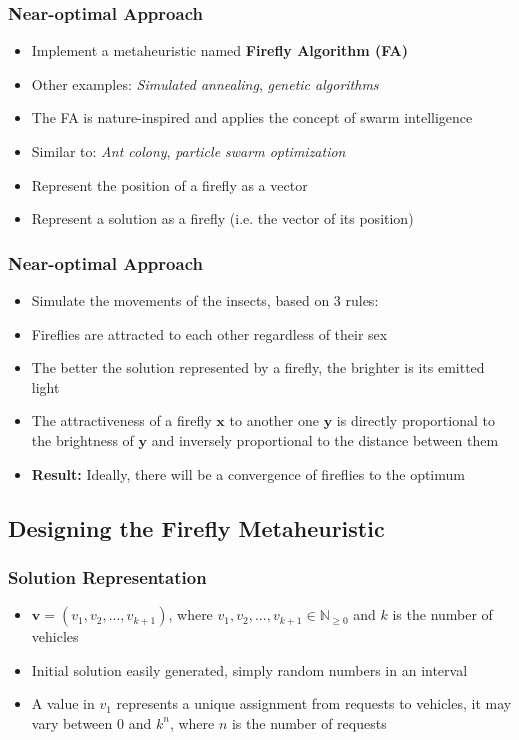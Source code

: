 \documentclass{beamer}
\begin{document}
\begin{frame}
\frametitle{Near-optimal Approach}
\begin{itemize}
\item Implement a metaheuristic named \textbf{Firefly Algorithm (FA)}
\item Other examples: \emph{Simulated annealing}, \emph{genetic algorithms}
\item The FA is nature-inspired and applies the concept of swarm intelligence
\item Similar to: \emph{Ant colony}, \emph{particle swarm optimization}
\pause
\item Represent the position of a firefly as a vector
\item Represent a solution as a firefly (i.e. the vector of its position)
\end{itemize}
\end{frame}

\begin{frame}
\frametitle{Near-optimal Approach}
\begin{itemize}
\item Simulate the movements of the insects, based on 3 rules:
\pause
\item Fireflies are attracted to each other regardless of their sex
\pause
\item The better the solution represented by a firefly, the brighter is its emitted light
\pause
\item The attractiveness of a firefly $\mathbf{x}$ to another one $\mathbf{y}$ is directly proportional to the brightness of $\mathbf{y}$ and inversely proportional to the distance between them
\pause
\item \textbf{Result:} Ideally, there will be a convergence of fireflies to the optimum
\end{itemize}
\end{frame}

\subsection{Designing the Firefly Metaheuristic}

\begin{frame}
\frametitle{Solution Representation}
\begin{itemize}
\item $\mathbf{v} = (v_1, v_2,...,v_{k+1})$, where $v_1,v_2,...,v_{k+1} \in \mathbb{N}_{\geq0}$ and $k$ is the number of vehicles
\item Initial solution easily generated, simply random numbers in an interval
\pause
\item A value in $v_1$ represents a unique assignment from requests to vehicles, it may vary between $0$ and $k^n$, where $n$ is the number of requests
\end{itemize}
\end{frame}
\end{document}
